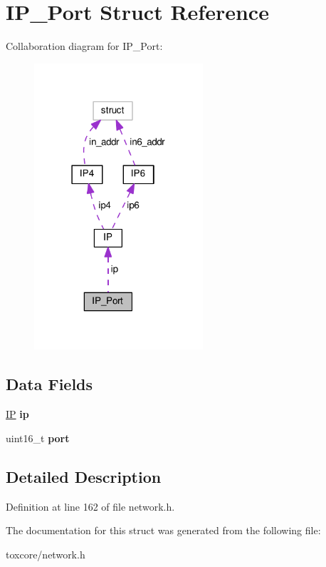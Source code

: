 \hypertarget{struct_i_p___port}{\section{I\+P\+\_\+\+Port Struct Reference}
\label{struct_i_p___port}
}


Collaboration diagram for I\+P\+\_\+\+Port\+:
\nopagebreak
\begin{figure}[H]
\begin{center}
\leavevmode
\includegraphics[width=178pt]{struct_i_p___port__coll__graph}
\end{center}
\end{figure}
\subsection*{Data Fields}
\begin{DoxyCompactItemize}
\item 
\hypertarget{struct_i_p___port_a0c6193a337a223c63411b2fe722d79ec}{\hyperlink{struct_i_p}{I\+P} {\bfseries ip}}\label{struct_i_p___port_a0c6193a337a223c63411b2fe722d79ec}

\item 
\hypertarget{struct_i_p___port_a8e0798404bf2cf5dabb84c5ba9a4f236}{uint16\+\_\+t {\bfseries port}}\label{struct_i_p___port_a8e0798404bf2cf5dabb84c5ba9a4f236}

\end{DoxyCompactItemize}


\subsection{Detailed Description}


Definition at line 162 of file network.\+h.



The documentation for this struct was generated from the following file\+:\begin{DoxyCompactItemize}
\item 
toxcore/network.\+h\end{DoxyCompactItemize}
